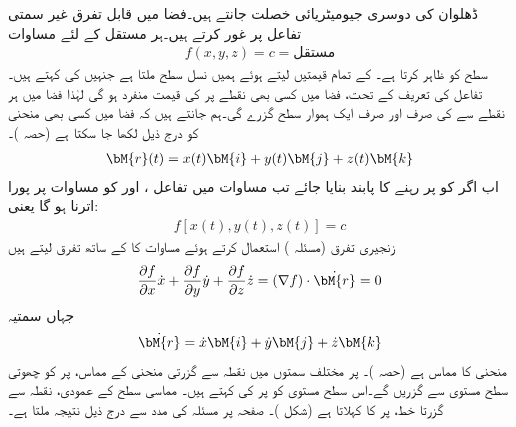 ڈھلوان کی دوسری جیومیٹریائی خصلت جانتے ہیں۔فضا میں قابل تفرق غیر سمتی تفاعل  پر غور کرتے ہیں۔ہر مستقل  کے لئے مساوات
\begin{align}\label{مساوات_الاحصاء_سمتی_تفرق_چ}
f(x,y,z)=c=\text{مستقل}
\end{align}
 سطح  کو ظاہر کرتا ہے۔ کے تمام قیمتیں لیتے ہوئے ہمیں نسل سطح ملتا ہے جنہیں  کی  کہتے ہیں۔ تفاعل کی تعریف کے تحت، فضا میں کسی بھی نقطے پر   کی قیمت منفرد ہو گی لہٰذا فضا میں ہر نقطے سے  کی صرف اور صرف ایک ہموار سطح گزرے گی۔ہم جانتے ہیں کہ فضا میں کسی بھی منحنی  کو درج ذیل لکھا جا سکتا ہے (حصہ )۔
\begin{align}\label{مساوات_الاحصاء_سمتی_تفرق_ح}
\bM{r}(t)=x(t)\bM{i}+y(t)\bM{j}+z(t)\bM{k}
\end{align}
اب اگر  کو  پر رہنے کا پابند بنایا جائے تب مساوات  میں تفاعل ،  اور  کو مساوات  پر پورا اترنا ہو گا یعنی:
\begin{align}\label{مساوات_الاحصاء_سمتی_تفرق_خ}
f[x(t),y(t),z(t)]=c
\end{align}
زنجیری تفرق  (مسئلہ ) استعمال کرتے ہوئے مساوات  کا  کے ساتھ تفرق لیتے ہیں
\begin{align}\label{مساوات_الاحصاء_سمتی_تفرق_د}
\frac{\partial f}{\partial x}\dot{x}+\frac{\partial f}{\partial y}\dot{y}+\frac{\partial f}{\partial z}\dot{z}=(\nabla f)\cdot \dot{\bM{r}}=0
\end{align}
جہاں سمتیہ
\begin{align*}
\dot{\bM{r}}=\dot{x}\bM{i}+\dot{y}\bM{j}+\dot{z}\bM{k}
\end{align*}
منحنی  کا مماس ہے (حصہ )۔  پر مختلف سمتوں میں نقطہ  سے  گزرتی منحنی کے مماس،  پر  کو چھوتی سطح مستوی سے گزریں گے۔اس سطح مستوی کو  پر  کی  کہتے ہیں۔ مماسی سطح کے عمودی، نقطہ  سے گزرتا خط،  پر  کا  کہلاتا ہے (شکل )۔ صفحہ  پر مسئلہ  کی مدد سے درج ذیل نتیجہ ملتا ہے۔
